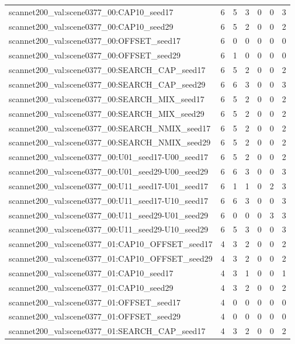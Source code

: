 \begin{table}[t]
\begin{tabular}{lrrrrrr}
scannet200\_val:scene0377\_00:CAP10\_seed17 & 6 & 5 & 3 & 0 & 0 & 3 \\
scannet200\_val:scene0377\_00:CAP10\_seed29 & 6 & 5 & 2 & 0 & 0 & 2 \\
scannet200\_val:scene0377\_00:OFFSET\_seed17 & 6 & 0 & 0 & 0 & 0 & 0 \\
scannet200\_val:scene0377\_00:OFFSET\_seed29 & 6 & 1 & 0 & 0 & 0 & 0 \\
scannet200\_val:scene0377\_00:SEARCH\_CAP\_seed17 & 6 & 5 & 2 & 0 & 0 & 2 \\
scannet200\_val:scene0377\_00:SEARCH\_CAP\_seed29 & 6 & 6 & 3 & 0 & 0 & 3 \\
scannet200\_val:scene0377\_00:SEARCH\_MIX\_seed17 & 6 & 5 & 2 & 0 & 0 & 2 \\
scannet200\_val:scene0377\_00:SEARCH\_MIX\_seed29 & 6 & 5 & 2 & 0 & 0 & 2 \\
scannet200\_val:scene0377\_00:SEARCH\_NMIX\_seed17 & 6 & 5 & 2 & 0 & 0 & 2 \\
scannet200\_val:scene0377\_00:SEARCH\_NMIX\_seed29 & 6 & 5 & 2 & 0 & 0 & 2 \\
scannet200\_val:scene0377\_00:U01\_seed17-U00\_seed17 & 6 & 5 & 2 & 0 & 0 & 2 \\
scannet200\_val:scene0377\_00:U01\_seed29-U00\_seed29 & 6 & 6 & 3 & 0 & 0 & 3 \\
scannet200\_val:scene0377\_00:U11\_seed17-U01\_seed17 & 6 & 1 & 1 & 0 & 2 & 3 \\
scannet200\_val:scene0377\_00:U11\_seed17-U10\_seed17 & 6 & 6 & 3 & 0 & 0 & 3 \\
scannet200\_val:scene0377\_00:U11\_seed29-U01\_seed29 & 6 & 0 & 0 & 0 & 3 & 3 \\
scannet200\_val:scene0377\_00:U11\_seed29-U10\_seed29 & 6 & 5 & 3 & 0 & 0 & 3 \\
scannet200\_val:scene0377\_01:CAP10\_OFFSET\_seed17 & 4 & 3 & 2 & 0 & 0 & 2 \\
scannet200\_val:scene0377\_01:CAP10\_OFFSET\_seed29 & 4 & 3 & 2 & 0 & 0 & 2 \\
scannet200\_val:scene0377\_01:CAP10\_seed17 & 4 & 3 & 1 & 0 & 0 & 1 \\
scannet200\_val:scene0377\_01:CAP10\_seed29 & 4 & 3 & 2 & 0 & 0 & 2 \\
scannet200\_val:scene0377\_01:OFFSET\_seed17 & 4 & 0 & 0 & 0 & 0 & 0 \\
scannet200\_val:scene0377\_01:OFFSET\_seed29 & 4 & 0 & 0 & 0 & 0 & 0 \\
scannet200\_val:scene0377\_01:SEARCH\_CAP\_seed17 & 4 & 3 & 2 & 0 & 0 & 2 \\

\end{tabular}
\end{table}
